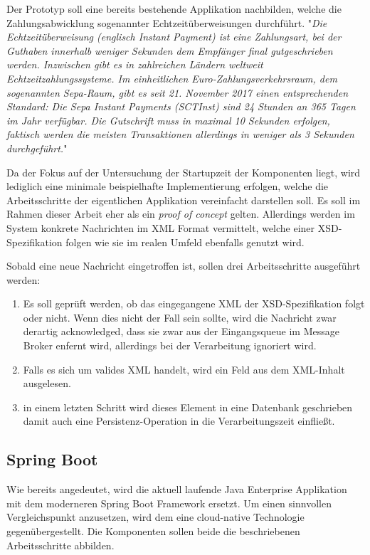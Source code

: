 Der Prototyp soll eine bereits bestehende Applikation nachbilden, welche die Zahlungsabwicklung sogenannter Echtzeitüberweisungen durchführt. "\emph{Die Echtzeitüberweisung (englisch Instant Payment) ist eine Zahlungsart, bei der Guthaben innerhalb weniger Sekunden dem Empfänger final gutgeschrieben werden. Inzwischen gibt es in zahlreichen Ländern weltweit Echtzeitzahlungssysteme. Im einheitlichen Euro-Zahlungsverkehrsraum, dem sogenannten Sepa-Raum, gibt es seit 21. November 2017 einen entsprechenden Standard: Die Sepa Instant Payments (SCTInst) sind 24 Stunden an 365 Tagen im Jahr verfügbar. Die Gutschrift muss in maximal 10 Sekunden erfolgen, faktisch werden die meisten Transaktionen allerdings in weniger als 3 Sekunden durchgeführt.}" \cite{instpay-def}

Da der Fokus auf der Untersuchung der Startupzeit der Komponenten liegt, wird lediglich eine minimale beispielhafte Implementierung erfolgen, welche die Arbeitsschritte der eigentlichen Applikation vereinfacht darstellen soll. Es soll im Rahmen dieser Arbeit eher als ein \emph{proof of concept} gelten. Allerdings werden im System konkrete Nachrichten im XML Format vermittelt, welche einer XSD-Spezifikation folgen wie sie im realen Umfeld ebenfalls genutzt wird. 


Sobald eine neue Nachricht eingetroffen ist, sollen drei Arbeitsschritte ausgeführt werden:

\begin{enumerate}

  \item Es soll geprüft werden, ob das eingegangene XML der XSD-Spezifikation folgt oder nicht. Wenn dies nicht der Fall sein sollte, wird die Nachricht zwar derartig acknowledged, dass sie zwar aus der Eingangsqueue im Message Broker enfernt wird, allerdings bei der Verarbeitung ignoriert wird.

  \item Falls es sich um valides XML handelt, wird ein Feld aus dem XML-Inhalt ausgelesen.

  \item in einem letzten Schritt wird dieses Element in eine Datenbank geschrieben damit auch eine Persistenz-Operation in die Verarbeitungszeit einfließt.

\end{enumerate}

\subsection{Spring Boot}
Wie bereits angedeutet, wird die aktuell laufende Java Enterprise Applikation mit dem moderneren Spring Boot Framework ersetzt. Um einen sinnvollen Vergleichspunkt anzusetzen, wird dem eine cloud-native Technologie gegenübergestellt. Die Komponenten sollen beide die beschriebenen Arbeitsschritte abbilden.

